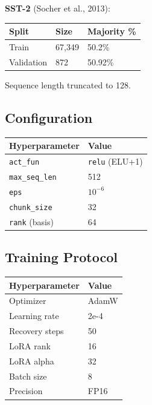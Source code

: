 \textbf{SST-2} (Socher et al., 2013):

\begin{table}[H]
\centering
\small
\begin{tabular}{lll}
\toprule
\textbf{Split} & \textbf{Size} & \textbf{Majority \%} \\
\midrule
Train & 67,349 & 50.2\% \\
Validation & 872 & 50.92\% \\
\bottomrule
\end{tabular}
\end{table}

Sequence length truncated to 128.

\subsection{Configuration}

\begin{table}[H]
\centering
\small
\begin{tabular}{ll}
\toprule
\textbf{Hyperparameter} & \textbf{Value} \\
\midrule
\texttt{act\_fun} & \texttt{relu} (ELU+1) \\
\texttt{max\_seq\_len} & 512 \\
\texttt{eps} & $10^{-6}$ \\
\texttt{chunk\_size} & 32 \\
\texttt{rank} (basis) & 64 \\
\bottomrule
\end{tabular}
\end{table}

\subsection{Training Protocol}

\begin{table}[H]
\centering
\small
\begin{tabular}{ll}
\toprule
\textbf{Hyperparameter} & \textbf{Value} \\
\midrule
Optimizer & AdamW \\
Learning rate & 2e-4 \\
Recovery steps & 50 \\
LoRA rank & 16 \\
LoRA alpha & 32 \\
Batch size & 8 \\
Precision & FP16 \\
\bottomrule
\end{tabular}
\end{table}

